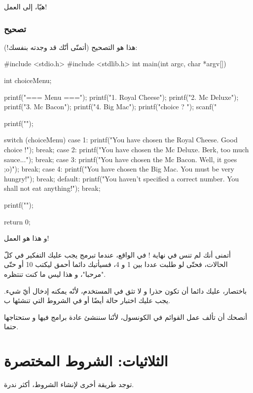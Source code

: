 هيّا، إلى العمل!

\subsubsection{تصحيح}

هذا هو التصحيح (أتمنّى أنّك قد وجدته بنفسك!):

\begin{Csource}
#include <stdio.h>
#include <stdlib.h>
int main(int argc, char *argv[])
{
	int choiceMenu;
	
	printf("=== Menu ===\n\n");
	printf("1. Royal Cheese\n");
	printf("2. Mc Deluxe\n");
	printf("3. Mc Bacon\n");
	printf("4. Big Mac\n");
	printf("\nYour choice ? ");
	scanf("%
	
	printf("\n");
	
	switch (choiceMenu)
	{
		case 1:
		printf("You have chosen the Royal Cheese. Good choice !");
		break;
		case 2:
		printf("You have chosen the Mc Deluxe. Berk, too much sauce...");
		break;
		case 3:
		printf("You have chosen the Mc Bacon. Well, it goes ;o)");
		break;
		case 4:
		printf("You have chosen the Big Mac. You must be very hungry!");
		break;
		default:
		printf("You haven't specified a correct number. You shall not eat anything!");
		break;
	}
	
	printf("\n\n");
	
	return 0;
}
\end{Csource}
و هذا هو العمل!

أتمنى أنك لم تنس 
 في نهاية !
في الواقع، عندما تبرمج يجب عليك التفكير في كلّ الحالات،  فحتّى لو طلبت عددا بين 1 و 4، فسيأتيك دائما أحمق ليكتب 10 أو حتّى "مرحبا"،  و هذا ليس ما كنت تنتظره. 

باختصار، عليك دائما أن تكون حذرا و لا تثق في المستخدم، لأنّه يمكنه إدخال أيّ شيء. يجب عليك اختبار حالة
أيضًا أو 
في الشروط التي تنشئها ب.

\begin{information}
أنصحك أن تألف عمل القوائم في الكونسول، لأنّنا سننشئ عادة برامج فيها و ستحتاجها حتما.
\end{information}

\section{الثلاثيات: الشروط المختصرة}

توجد طريقة أخرى لإنشاء الشروط، أكثر ندرة.

